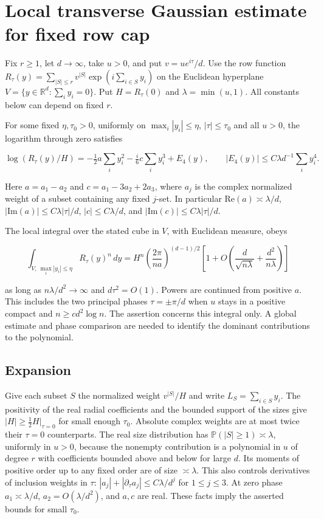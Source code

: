 \section{Local transverse Gaussian estimate for fixed row cap}\label{sec:transverse}

Fix $r\ge1$, let $d\to\infty$, take $u>0$, and put $v=ue^{i\tau}/d$. Use the row function
$R_\tau(y)=\sum_{|S|\le r}v^{|S|}\exp(i\sum_{i\in S}y_i)$ on the Euclidean hyperplane $V=\{y\in\mathbb R^d:\sum_i y_i=0\}$. Put $H=R_\tau(0)$ and $\lambda=\min(u,1)$. All constants below can depend on fixed $r$.

For some fixed $\eta,\tau_0>0$, uniformly on $\max_i|y_i|\le\eta$, $|\tau|\le\tau_0$ and all $u>0$, the logarithm through zero satisfies

\begin{equation*}
\log(R_\tau(y)/H)=-\tfrac12 a\sum_i y_i^2-\tfrac i6 c\sum_i y_i^3+E_4(y),\qquad
|E_4(y)|\le C\lambda d^{-1}\sum_i y_i^4.
\end{equation*}

Here $a=a_1-a_2$ and $c=a_1-3a_2+2a_3$, where $a_j$ is the complex normalized weight of a subset containing any fixed $j$-set. In particular $\mathrm{Re}(a)\asymp\lambda/d$, $|\mathrm{Im}(a)|\le C\lambda|\tau|/d$, $|c|\le C\lambda/d$, and $|\mathrm{Im}(c)|\le C\lambda|\tau|/d$.

The local integral over the stated cube in $V$, with Euclidean measure, obeys

\begin{equation*}
\int_{V,\ \max_i|y_i|\le\eta} R_\tau(y)^n\,dy
=H^n\left(\frac{2\pi}{na}\right)^{(d-1)/2}
\left[1+O\left(\frac{d}{\sqrt{n\lambda}}+\frac{d^2}{n\lambda}\right)\right]
\end{equation*}

as long as $n\lambda/d^2\to\infty$ and $d\tau^2=O(1)$. Powers are continued from positive $a$. This includes the two principal phases $\tau=\pm\pi/d$ when $u$ stays in a positive compact and $n\ge c d^2\log n$. The assertion concerns this integral only. A global estimate and phase comparison are needed to identify the dominant contributions to the polynomial.

\subsection{Expansion}

Give each subset $S$ the normalized weight $v^{|S|}/H$ and write $L_S=\sum_{i\in S}y_i$. The positivity of the real radial coefficients and the bounded support of the sizes give $|H|\ge\tfrac12 H|_{\tau=0}$ for small enough $\tau_0$. Absolute complex weights are at most twice their $\tau=0$ counterparts. The real size distribution has $\mathbb P(|S|\ge1)\asymp\lambda$, uniformly in $u>0$, because the nonempty contribution is a polynomial in $u$ of degree $r$ with coefficients bounded above and below for large $d$. Its moments of positive order up to any fixed order are of size $\asymp\lambda$. This also controls derivatives of inclusion weights in $\tau$: $|a_j|+|\partial_\tau a_j|\le C\lambda/d^j$ for $1\le j\le3$. At zero phase $a_1\asymp\lambda/d$, $a_2=O(\lambda/d^2)$, and $a,c$ are real. These facts imply the asserted bounds for small $\tau_0$.

